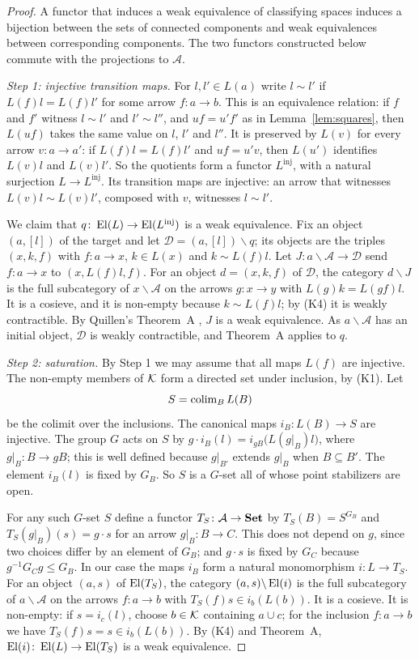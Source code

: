 \begin{proof}
A functor that induces a weak equivalence of classifying spaces induces a
bijection between the sets of connected components and weak equivalences
between corresponding components. The two functors constructed below commute
with the projections to $\mathcal A$.

\emph{Step 1: injective transition maps.} For $l,l'\in L(a)$ write $l\sim l'$
if $L(f)l=L(f)l'$ for some arrow $f\colon a\to b$. This is an equivalence
relation: if $f$ and $f'$ witness $l\sim l'$ and $l'\sim l''$, and $uf=u'f'$ as
in Lemma~\ref{lem:squares}, then $L(uf)$ takes the same value on $l$, $l'$ and
$l''$. It is preserved by $L(v)$ for every arrow $v\colon a\to a'$: if
$L(f)l=L(f)l'$ and $uf=u'v$, then $L(u')$ identifies $L(v)l$ and $L(v)l'$.
So the quotients form a functor $L^{\mathrm{inj}}$, with a natural surjection
$L\to L^{\mathrm{inj}}$. Its transition maps are injective: an arrow that
witnesses $L(v)l\sim L(v)l'$, composed with $v$, witnesses $l\sim l'$.

We claim that $q\colon\operatorname{El}(L)\to\operatorname{El}(L^{\mathrm{inj}})$ is a weak equivalence. Fix
an object $(a,[l])$ of the target and let $\mathcal D=(a,[l])\backslash q$; its
objects are the triples $(x,k,f)$ with $f\colon a\to x$, $k\in L(x)$ and
$k\sim L(f)l$. Let $J\colon a\backslash\mathcal A\to\mathcal D$ send
$f\colon a\to x$ to $(x,L(f)l,f)$. For an object $d=(x,k,f)$ of $\mathcal D$,
the category $d\backslash J$ is the full subcategory of $x\backslash\mathcal A$
on the arrows $g\colon x\to y$ with $L(g)k=L(gf)l$. It is a cosieve, and it is
non-empty because $k\sim L(f)l$; by (K4) it is weakly contractible. By
Quillen's Theorem~A \cite[\S 1]{Quillen}, $J$ is a weak equivalence. As
$a\backslash\mathcal A$ has an initial object, $\mathcal D$ is weakly
contractible, and Theorem~A applies to $q$.

\emph{Step 2: saturation.} By Step 1 we may assume that all maps $L(f)$ are
injective. The non-empty members of $\mathcal{K}$ form a directed set under inclusion,
by (K1). Let
\[
 S=\operatorname{colim}_{B}L(B)
\]
be the colimit over the inclusions. The canonical maps $i_B\colon L(B)\to S$
are injective. The group $G$ acts on $S$ by
$g\cdot i_B(l)=i_{gB}\bigl(L(g|_B)l\bigr)$, where $g|_B\colon B\to gB$; this is
well defined because $g|_{B'}$ extends $g|_B$ when $B\subseteq B'$. The element
$i_B(l)$ is fixed by $G_B$. So $S$ is a $G$-set all of whose point stabilizers
are open.

For any such $G$-set $S$ define a functor $T_S\colon\mathcal A\to\mathbf{Set}$ by
$T_S(B)=S^{G_B}$ and $T_S(g|_B)(s)=g\cdot s$ for an arrow $g|_B\colon B\to C$.
This does not depend on $g$, since two choices differ by an element of $G_B$;
and $g\cdot s$ is fixed by $G_C$ because $g^{-1}G_Cg\le G_B$. In our case the
maps $i_B$ form a natural monomorphism $i\colon L\to T_S$. For an object
$(a,s)$ of $\operatorname{El}(T_S)$, the category $(a,s)\backslash\operatorname{El}(i)$ is the full
subcategory of $a\backslash\mathcal A$ on the arrows $f\colon a\to b$ with
$T_S(f)s\in i_b(L(b))$. It is a cosieve. It is non-empty: if $s=i_c(l)$,
choose $b\in\mathcal{K}$ containing $a\cup c$; for the inclusion $f\colon a\to b$ we
have $T_S(f)s=s\in i_b(L(b))$. By (K4) and Theorem~A,
$\operatorname{El}(i)\colon\operatorname{El}(L)\to\operatorname{El}(T_S)$ is a weak equivalence.


\end{proof}
